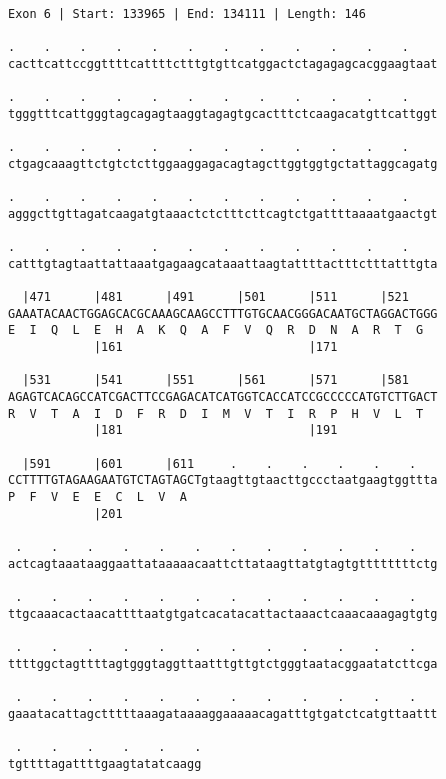 \documentclass{article}
\begin{document}
\begin{Verbatim}
Exon 6 | Start: 133965 | End: 134111 | Length: 146
 
.    .    .    .    .    .    .    .    .    .    .    .    
cacttcattccggttttcattttctttgtgttcatggactctagagagcacggaagtaat
  
.    .    .    .    .    .    .    .    .    .    .    .    
tgggtttcattgggtagcagagtaaggtagagtgcactttctcaagacatgttcattggt
  
.    .    .    .    .    .    .    .    .    .    .    .    
ctgagcaaagttctgtctcttggaaggagacagtagcttggtggtgctattaggcagatg
  
.    .    .    .    .    .    .    .    .    .    .    .    
agggcttgttagatcaagatgtaaactctctttcttcagtctgattttaaaatgaactgt
  
.    .    .    .    .    .    .    .    .    .    .    .    
catttgtagtaattattaaatgagaagcataaattaagtattttactttctttatttgta
  
  |471      |481      |491      |501      |511      |521    
GAAATACAACTGGAGCACGCAAAGCAAGCCTTTGTGCAACGGGACAATGCTAGGACTGGG
E  I  Q  L  E  H  A  K  Q  A  F  V  Q  R  D  N  A  R  T  G  
            |161                          |171              
  
  |531      |541      |551      |561      |571      |581    
AGAGTCACAGCCATCGACTTCCGAGACATCATGGTCACCATCCGCCCCCATGTCTTGACT
R  V  T  A  I  D  F  R  D  I  M  V  T  I  R  P  H  V  L  T  
            |181                          |191              
  
  |591      |601      |611     .    .    .    .    .    .   
CCTTTTGTAGAAGAATGTCTAGTAGCTgtaagttgtaacttgccctaatgaagtggttta
P  F  V  E  E  C  L  V  A                                   
            |201                                            
  
 .    .    .    .    .    .    .    .    .    .    .    .   
actcagtaaataaggaattataaaaacaattcttataagttatgtagtgttttttttctg
  
 .    .    .    .    .    .    .    .    .    .    .    .   
ttgcaaacactaacattttaatgtgatcacatacattactaaactcaaacaaagagtgtg
  
 .    .    .    .    .    .    .    .    .    .    .    .   
ttttggctagttttagtgggtaggttaatttgttgtctgggtaatacggaatatcttcga
  
 .    .    .    .    .    .    .    .    .    .    .    .   
gaaatacattagctttttaaagataaaaggaaaaacagatttgtgatctcatgttaattt
  
 .    .    .    .    .    .
tgttttagattttgaagtatatcaagg
\end{Verbatim}
\end{document}
